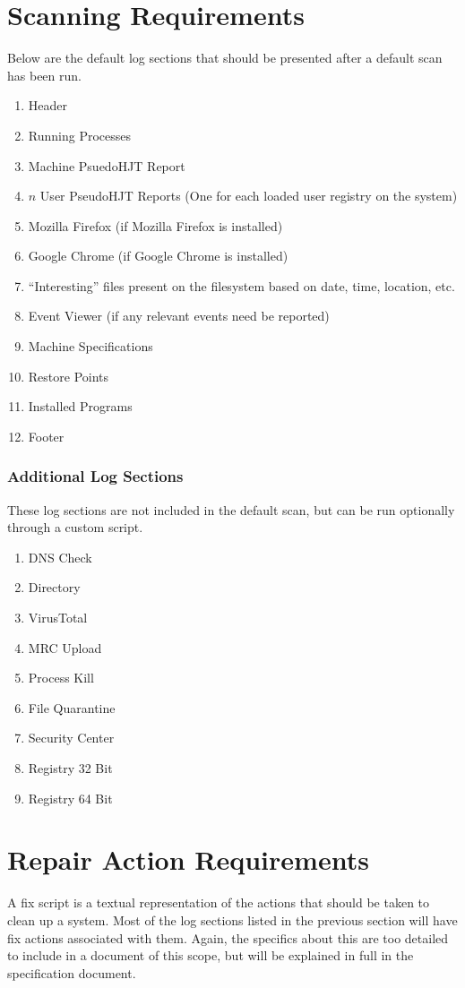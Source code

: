 \documentclass[letterpaper,12pt]{article}
\begin{document}
\section{Scanning Requirements}
Below are the default log sections that should be presented after a default scan
has been run.
\begin{enumerate}
    \item Header
    \item Running Processes
    \item Machine PsuedoHJT Report
    \item $n$ User PseudoHJT Reports (One for each loaded user registry on the
    system)
    \item Mozilla Firefox (if Mozilla Firefox is installed)
    \item Google Chrome (if Google Chrome is installed)
    \item ``Interesting'' files present on the filesystem based on date, time,
    location, etc.
    \item Event Viewer (if any relevant events need be reported)
    \item Machine Specifications
    \item Restore Points
    \item Installed Programs
    \item Footer
\end{enumerate}
\subsubsection{Additional Log Sections}
These log sections are not included in the default scan, but can be run
optionally through a custom script.
\begin{enumerate}
\item DNS Check
	\item Directory 
	\item VirusTotal 
	\item MRC Upload
	\item Process Kill
	\item File Quarantine
	\item Security Center
	\item Registry 32 Bit
	\item Registry 64 Bit
\end{enumerate}

\newpage



\section{Repair Action Requirements}
A fix script is a textual representation of the actions that should be taken to
clean up a system.  Most of the log sections listed in the previous section will
have fix actions associated with them.  Again, the specifics about this are too
detailed to include in a document of this scope, but will be explained in full
in the specification document.
\end{document}
